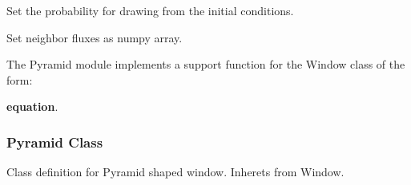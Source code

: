 \documentclass[letterpaper,10pt,english]{sphinxmanual}
\begin{document}
\begin{fulllineitems}
\begin{fulllineitems}
\end{fulllineitems}


\begin{fulllineitems}
\label{applications/applications.doc:window.window.set_initial_conditions_probability}
Set the probability for drawing from the initial conditions.

\end{fulllineitems}


\begin{fulllineitems}
\label{applications/applications.doc:window.window.update_fluxes}
Set neighbor fluxes as numpy array.

\end{fulllineitems}


\end{fulllineitems}


The Pyramid module implements a support function for the Window class of the form:

\textbf{equation}.


\subsubsection{Pyramid Class}
\label{applications/applications.doc:pyramid-class}\label{applications/applications.doc:module-pyramid}
Class definition for Pyramid shaped window. Inherets from Window.
\end{document}
